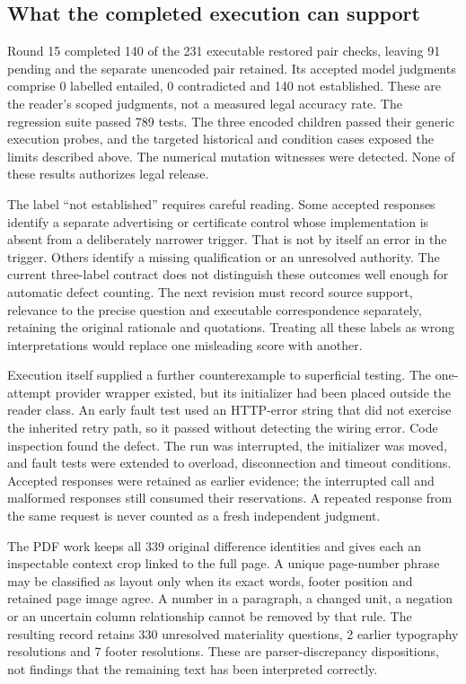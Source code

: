 \subsection{What the completed execution can support}

Round 15 completed 140 of the 231 executable restored pair checks, leaving 91 pending and the separate unencoded pair retained. Its accepted model judgments comprise 0 labelled entailed, 0 contradicted and 140 not established. These are the reader's scoped judgments, not a measured legal accuracy rate. The regression suite passed 789 tests. The three encoded children passed their generic execution probes, and the targeted historical and condition cases exposed the limits described above. The numerical mutation witnesses were detected. None of these results authorizes legal release.

The label ``not established'' requires careful reading. Some accepted responses
identify a separate advertising or certificate control whose implementation is
absent from a deliberately narrower trigger. That is not by itself an error in
the trigger. Others identify a missing qualification or an unresolved authority.
The current three-label contract does not distinguish these outcomes well enough
for automatic defect counting. The next revision must record source support,
relevance to the precise question and executable correspondence separately,
retaining the original rationale and quotations. Treating all these labels as
wrong interpretations would replace one misleading score with another.

Execution itself supplied a further counterexample to superficial testing. The
one-attempt provider wrapper existed, but its initializer had been placed outside
the reader class. An early fault test used an HTTP-error string that did not
exercise the inherited retry path, so it passed without detecting the wiring
error. Code inspection found the defect. The run was interrupted, the initializer
was moved, and fault tests were extended to overload, disconnection and timeout
conditions. Accepted responses were retained as earlier evidence; the interrupted
call and malformed responses still consumed their reservations. A repeated
response from the same request is never counted as a fresh independent judgment.

The PDF work keeps all 339 original difference identities and gives each an
inspectable context crop linked to the full page. A unique page-number phrase
may be classified as layout only when its exact words, footer position and
retained page image agree. A number in a paragraph, a changed unit, a negation or
an uncertain column relationship cannot be removed by that rule. The resulting record retains 330 unresolved materiality questions, 2 earlier typography resolutions and 7 footer resolutions.
These are parser-discrepancy dispositions, not findings that the remaining text
has been interpreted correctly.

